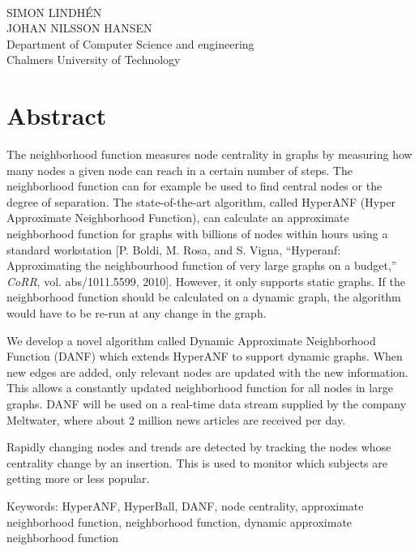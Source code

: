 \maintitle\\
\subtitle\\
SIMON LINDHÉN\\
JOHAN NILSSON HANSEN\\
Department of Computer Science and engineering\\
Chalmers University of Technology \setlength{\parskip}{0.5cm}

\thispagestyle{plain}			%
\setlength{\parskip}{0pt plus 1.0pt}
\setlength{\parindent}{15pt}
\section*{Abstract}
The neighborhood function measures node centrality in graphs by measuring how many nodes a given node can reach in a certain number of steps. The neighborhood function can for example be used to find central nodes or the degree of separation. The state-of-the-art algorithm, called HyperANF (Hyper Approximate Neighborhood Function), can calculate an approximate neighborhood function for graphs with billions of nodes within hours using a standard workstation [P. Boldi, M. Rosa, and S. Vigna, “Hyperanf:  Approximating the neighbourhood function of very large graphs on a budget,” \textit{CoRR}, vol. abs/1011.5599, 2010]. However, it only supports static graphs. If the neighborhood function should be calculated on a dynamic graph, the algorithm would have to be re-run at any change in the graph. 

We develop a novel algorithm called Dynamic Approximate Neighborhood Function (DANF) which extends HyperANF to support dynamic graphs. When new edges are added, only relevant nodes are updated with the new information. This allows a constantly updated neighborhood function for all nodes in large graphs. DANF will be used on a real-time data stream supplied by the company Meltwater, where about 2 million news articles are received per day.

Rapidly changing nodes and trends are detected by tracking the nodes whose centrality change by an insertion. This is used to monitor which subjects are getting more or less popular. 

\vfill
\noindent Keywords: HyperANF, HyperBall, DANF, node centrality, approximate neighborhood function, neighborhood function, dynamic approximate neighborhood function

\newpage				%
\thispagestyle{empty}
\mbox{}